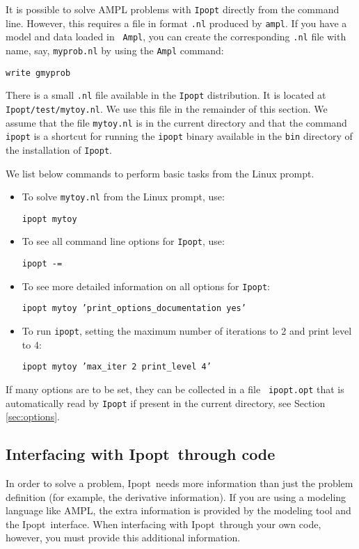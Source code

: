 \documentclass[10pt]{article}
\newcommand{\Ipopt}{{\sc Ipopt}}
\begin{document}
It is possible to solve AMPL problems with {\tt Ipopt} directly from
the command line. However, this requires a file in format {\tt .nl}
produced by {\tt ampl}.  If you have a model and data loaded in {\tt
  Ampl}, you can create the corresponding {\tt .nl} file with name,
say, {\tt myprob.nl} by using the {\tt Ampl} command:

{\tt write gmyprob}

There is a small {\tt .nl} file available in the {\tt Ipopt} distribution. It is
located at {\tt Ipopt/test/mytoy.nl}. 
We use this file in the remainder of this section. We assume that the file
{\tt mytoy.nl} is in the current directory and that the command 
{\tt ipopt} is a shortcut for running the {\tt ipopt} binary available
in the {\tt bin} directory of the installation of {\tt Ipopt}. 

We list below commands to perform basic tasks from the Linux prompt.

\begin{itemize}
\item To solve {\tt mytoy.nl} from the Linux prompt, use:

{\tt ipopt mytoy}

\item To see all command line options for {\tt Ipopt}, use:

{\tt ipopt -=}

\item To see more detailed information on all options for {\tt Ipopt}:

{\tt ipopt mytoy 'print\_options\_documentation yes'}

\item To run {\tt ipopt}, setting the maximum number of iterations to 2 and 
print level to 4:

{\tt ipopt mytoy 'max\_iter 2 print\_level 4'}
\end{itemize}

If many options are to be set, they can be collected in a file {\tt
  ipopt.opt} that is automatically read by {\tt Ipopt} if present in
the current directory, see Section \ref{sec:options}.


\subsection{Interfacing with \Ipopt\ through code}
In order to solve a problem, \Ipopt\ needs more information than just
the problem definition (for example, the derivative information). If
you are using a modeling language like AMPL, the extra information is
provided by the modeling tool and the \Ipopt\ interface. When
interfacing with \Ipopt\ through your own code, however, you must
provide this additional information.
\end{document}
